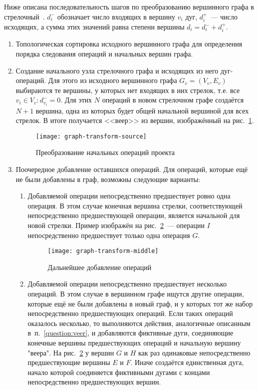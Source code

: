 Ниже описана последовательность шагов по преобразованию вершинного графа в стрелочный~\cite{VSU-5y}. $d_i^-$ обозначает число входящих в вершину $v_i$ дуг, $d_i^+$~--- число исходящих, а сумма этих значений равна степени вершины $d_i=d_i^-+d_i^+$.
\begin{enumerate}
\label{ConversionAlgo}
	\item Топологическая сортировка исходного вершинного графа для определения порядка следования операций и начальных вершин графа.
	\item \label{question:veer} Создание начального узла стрелочного графа и исходящих из него дуг-операций. Для этого из исходного вершинного графа $ G_v = (V_v,E_v)$ выбираются те вершины, у которых нет входящих в них стрелок, т.е. все $v_i \in V_v: d_{v_i}^-=0$. Для этих $N$ операций в новом стрелочном графе создаётся $N+1$ вершина, одна из которых будет общей начальной вершиной для всех стрелок. В итоге получается <<веер>> из вершин, изображённый на рис.~\ref{fig:graph-transform-source}.
	\begin{figure}[h!]
		\centering
		{
			\texttt{[image: graph-transform-source]}
		}
		\caption{Преобразование начальных операций проекта}
		\label{fig:graph-transform-source}
	\end{figure}
	\item Поочередное добавление оставшихся операций. Для операций, которые ещё не были добавлены в граф, возможны следующие варианты:
	\begin{enumerate}
		\item Добавляемой операции непосредственно предшествует ровно одна операция. В этом случае конечная вершина стрелки, соответствующей непосредственно предшествующей операции, является начальной для новой стрелки. Пример изображён на рис.~\ref{fig:graph-transform-middle}~--- операции $I$ непосредственно предшествует только одна операция  $G$.
		\begin{figure}[h!]
			\centering
			{
				\texttt{[image: graph-transform-middle]}
			}
			\caption{Дальнейшее добавление операций}
			\label{fig:graph-transform-middle}
		\end{figure}
		\item Добавляемой операции непосредственно предшествует несколько операций. В этом случае в вершинном графе ищутся другие операции, которые ещё не были добавлены в новый граф, и у которых тот же набор непосредственно предшествующих операций. Если таких операций оказалось несколько, то выполняются действия, аналогичные описанным в~п.~\ref{question:veer}, и добавляются фиктивные дуги, соединяющие конечные вершины предшествующих операций и начальную вершину "веера". На рис.~\ref{fig:graph-transform-middle} у вершин $G$ и $H$ как раз одинаковые непосредственно предшествующие вершины $E$ и $F$. Иначе создаётся единственная дуга, начало которой соединяется фиктивными дугами с концами непосредственно предшествующих вершин.

\end{enumerate}
\end{enumerate}
